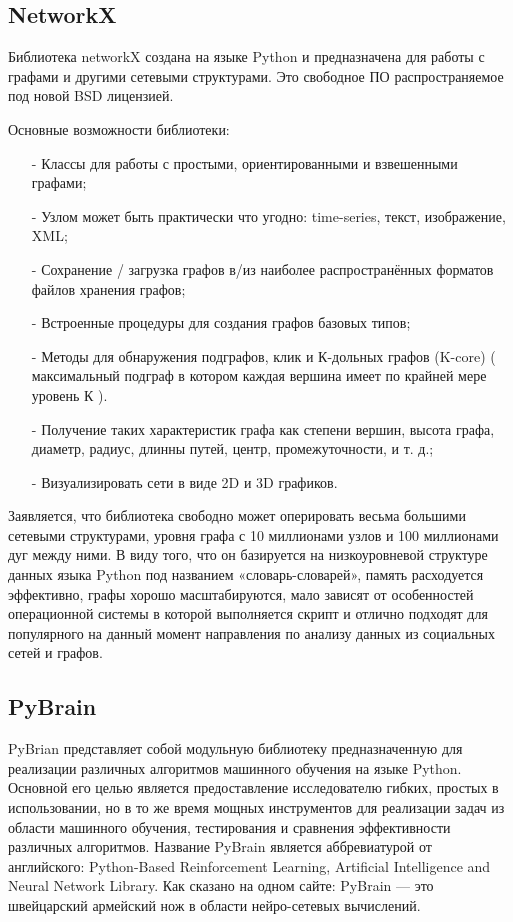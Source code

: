 \subsection{NetworkX}
Библиотека networkX создана на языке Python и предназначена для работы с графами и другими сетевыми структурами. 
Это свободное ПО распространяемое под новой BSD лицензией.

Основные возможности библиотеки:
\begin{itemize}
 \item [-] Классы для работы с простыми, ориентированными и взвешенными графами;
 \item [-] Узлом может быть практически что угодно: time-series, текст, изображение, XML;
 \item [-] Сохранение / загрузка графов в/из наиболее распространённых форматов файлов хранения графов;
 \item [-] Встроенные процедуры для создания графов базовых типов;
 \item [-] Методы для обнаружения подграфов, клик и К-дольных графов (K-core) ( максимальный подграф в котором каждая вершина имеет по крайней мере уровень К ).
 \item [-] Получение таких характеристик графа как степени вершин, высота графа, диаметр, радиус, длинны путей, центр, промежуточности, и т. д.;
 \item [-] Визуализировать сети в виде 2D и 3D графиков.
\end{itemize}

Заявляется, что библиотека свободно может оперировать весьма большими сетевыми структурами, уровня графа с 10 миллионами узлов и 100 миллионами дуг между ними. 
В виду того, что он базируется на низкоуровневой структуре данных языка Python под названием «словарь-словарей», память расходуется эффективно, графы хорошо масштабируются, мало зависят от особенностей операционной системы в которой выполняется скрипт и отлично подходят для популярного на данный момент направления по анализу данных из социальных сетей и графов.\cite{networkx-habr}

\subsection{PyBrain}

PyBrian представляет собой модульную библиотеку предназначенную для реализации различных алгоритмов машинного обучения на языке Python. Основной его целью является предоставление исследователю гибких, простых в использовании, но в то же время мощных инструментов для реализации задач из области машинного обучения, тестирования и сравнения эффективности различных алгоритмов.
Название PyBrain является аббревиатурой от английского: Python-Based Reinforcement Learning, Artificial Intelligence and Neural Network Library.
Как сказано на одном сайте: PyBrain --- это швейцарский армейский нож в области нейро-сетевых вычислений. 

